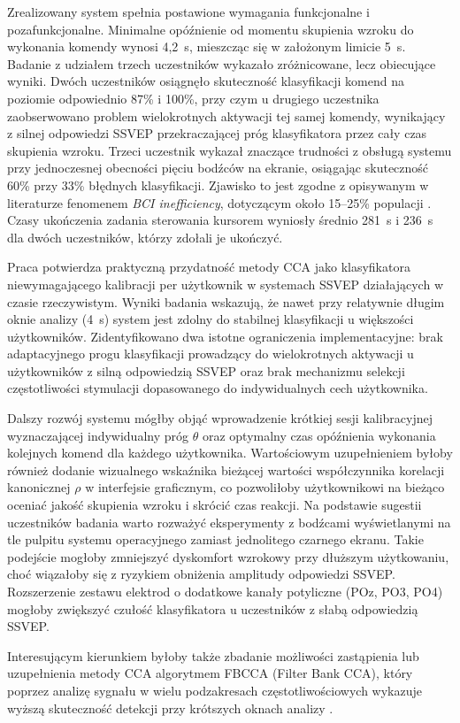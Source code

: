 Zrealizowany system spełnia postawione wymagania funkcjonalne
i pozafunkcjonalne. Minimalne opóźnienie od momentu skupienia wzroku
do wykonania komendy wynosi 4,2~s, mieszcząc się w założonym limicie
5~s. Badanie z udziałem trzech uczestników wykazało zróżnicowane,
lecz obiecujące wyniki. Dwóch uczestników osiągnęło skuteczność
klasyfikacji komend na poziomie odpowiednio 87\% i 100\%,
przy czym u drugiego uczestnika zaobserwowano problem wielokrotnych
aktywacji tej samej komendy, wynikający z silnej odpowiedzi SSVEP
przekraczającej próg klasyfikatora przez cały czas skupienia wzroku.
Trzeci uczestnik wykazał znaczące trudności z obsługą systemu
przy jednoczesnej obecności pięciu bodźców na ekranie,
osiągając skuteczność 60\% przy 33\% błędnych klasyfikacji.
Zjawisko to jest zgodne z opisywanym w literaturze fenomenem
\textit{BCI inefficiency}, dotyczącym około 15--25\% populacji
\cite{vialatte2010}. Czasy ukończenia zadania sterowania kursorem
wyniosły średnio 281~s i 236~s dla dwóch uczestników,
którzy zdołali je ukończyć.

Praca potwierdza praktyczną przydatność metody CCA jako klasyfikatora
niewymagającego kalibracji per użytkownik w systemach SSVEP
działających w czasie rzeczywistym. Wyniki badania wskazują,
że nawet przy relatywnie długim oknie analizy (4~s) system
jest zdolny do stabilnej klasyfikacji u większości użytkowników.
Zidentyfikowano dwa istotne ograniczenia implementacyjne:
brak adaptacyjnego progu klasyfikacji prowadzący do wielokrotnych
aktywacji u użytkowników z silną odpowiedzią SSVEP
oraz brak mechanizmu selekcji częstotliwości stymulacji
dopasowanego do indywidualnych cech użytkownika.

Dalszy rozwój systemu mógłby objąć wprowadzenie krótkiej sesji
kalibracyjnej wyznaczającej indywidualny próg $\theta$ oraz
optymalny czas opóźnienia wykonania kolejnych komend dla każdego użytkownika.
Wartościowym uzupełnieniem byłoby również dodanie wizualnego
wskaźnika bieżącej wartości współczynnika korelacji kanonicznej
$\rho$ w interfejsie graficznym, co pozwoliłoby użytkownikowi
na bieżąco oceniać jakość skupienia wzroku i skrócić czas reakcji.
Na podstawie sugestii uczestników badania warto rozważyć eksperymenty z bodźcami wyświetlanymi na tle pulpitu systemu operacyjnego zamiast jednolitego czarnego ekranu. Takie podejście mogłoby zmniejszyć dyskomfort wzrokowy przy dłuższym użytkowaniu, choć wiązałoby się z ryzykiem obniżenia amplitudy odpowiedzi SSVEP.
Rozszerzenie zestawu elektrod o dodatkowe kanały potyliczne
(POz, PO3, PO4) mogłoby zwiększyć czułość klasyfikatora
u uczestników z słabą odpowiedzią SSVEP.

Interesującym kierunkiem byłoby także zbadanie możliwości
zastąpienia lub uzupełnienia metody CCA algorytmem
FBCCA (Filter Bank CCA), który poprzez analizę sygnału
w wielu podzakresach częstotliwościowych wykazuje wyższą
skuteczność detekcji przy krótszych oknach analizy \cite{chen2015}.